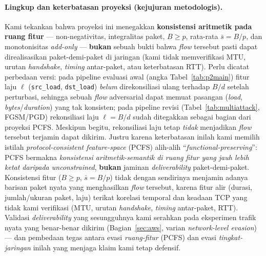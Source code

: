 \documentclass[11pt,a4paper]{article}
\begin{document}
\paragraph{Lingkup dan keterbatasan proyeksi (kejujuran metodologis).} Kami
tekankan bahwa proyeksi ini menegakkan \textbf{konsistensi aritmetik pada ruang
fitur} --- non-negativitas, integralitas paket, $B \ge p$, rata-rata
$\bar{s}=B/p$, dan monotonisitas \emph{add-only} --- \textbf{bukan} sebuah bukti
bahwa \emph{flow} tersebut pasti dapat direalisasikan paket-demi-paket di jaringan
(kami tidak memverifikasi MTU, urutan \emph{handshake}, \emph{timing} antar-paket,
atau keterbatasan RTT). Perlu dicatat perbedaan versi: pada pipeline evaluasi awal (angka
Tabel~\ref{tab:p2main}) fitur laju $\ell$ (\texttt{src\_load}, \texttt{dst\_load})
\emph{belum} direkonsiliasi ulang terhadap $B/d$ setelah perturbasi, sehingga
sebuah \emph{flow} adversarial dapat memuat pasangan (\emph{load},
\emph{bytes}/\emph{duration}) yang tak konsisten; pada pipeline revisi
(Tabel~\ref{tab:multiattack}, FGSM/PGD) rekonsiliasi laju $\ell=B/d$ sudah
ditegakkan sebagai bagian dari proyeksi PCFS. Meskipun begitu, rekonsiliasi laju
tetap \emph{tidak} menjadikan \emph{flow} tersebut terjamin dapat dikirim. Justru
karena keterbatasan inilah kami memilih istilah
\emph{protocol-consistent feature-space} (PCFS) alih-alih ``\emph{functional-preserving}'':
PCFS bermakna \emph{konsistensi aritmetik-semantik di ruang fitur yang jauh lebih
ketat daripada unconstrained}, \textbf{bukan} jaminan \emph{deliverability}
paket-demi-paket. Konsistensi fitur ($B\ge p$, $\bar{s}=B/p$) tidak dengan
sendirinya menjamin adanya barisan paket nyata yang menghasilkan \emph{flow}
tersebut, karena fitur alir (durasi, jumlah/ukuran paket, laju) terikat korelasi
temporal dan keadaan TCP yang tidak kami verifikasi (MTU, urutan \emph{handshake},
\emph{timing} antar-paket, RTT). Validasi \emph{deliverability} yang sesungguhnya
kami serahkan pada eksperimen trafik nyata yang benar-benar dikirim
(Bagian~\ref{sec:aws}, varian \emph{network-level evasion}) --- dan pembedaan tegas
antara evasi \emph{ruang-fitur} (PCFS) dan evasi \emph{tingkat-jaringan} inilah yang
menjaga klaim kami tetap defensif.
\end{document}
